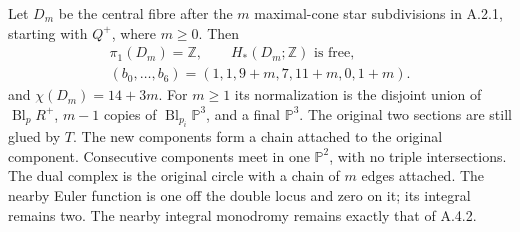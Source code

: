 \begin{proposition}\label{push:A46}
Let $D_m$ be the central fibre after the $m$ maximal-cone
star subdivisions in A.2.1, starting with $Q^+$, where
$m\geq0$. Then
\[
 \begin{gathered}
 \pi_1(D_m)=\mathbb Z,\qquad
 H_*(D_m;\mathbb Z)\text{ is free},\\
 (b_0,\ldots,b_6)=(1,1,9+m,7,11+m,0,1+m).
 \end{gathered}
\]
and $\chi(D_m)=14+3m$. For $m\geq1$ its normalization is
the disjoint union of $\operatorname{Bl}_pR^+$, $m-1$
copies of $\operatorname{Bl}_{p_i}\mathbb P^3$, and a final
$\mathbb P^3$. The original two sections are still glued
by $T$. The new components form a chain attached to the
original component. Consecutive components meet in one
$\mathbb P^2$, with no triple intersections. The dual
complex is the original circle with a chain of $m$ edges
attached. The nearby Euler function is one off the double
locus and zero on it; its integral remains two. The nearby
integral monodromy remains exactly that of A.4.2.
\end{proposition}
